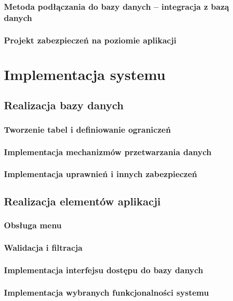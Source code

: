 \documentclass[a4paper, 12pt]{article}
\begin{document}
\subsubsection{Metoda podłączania do bazy danych – integracja z bazą danych}
\subsubsection{Projekt zabezpieczeń na poziomie aplikacji}

\section{Implementacja systemu}
\subsection{Realizacja bazy danych}
\subsubsection{Tworzenie tabel i definiowanie ograniczeń}
\subsubsection{Implementacja mechanizmów przetwarzania danych}
\subsubsection{Implementacja uprawnień i innych zabezpieczeń}

\subsection{Realizacja elementów aplikacji}
\subsubsection{Obsługa menu}
\subsubsection{Walidacja i filtracja}
\subsubsection{Implementacja interfejsu dostępu do bazy danych}
\subsubsection{Implementacja wybranych funkcjonalności systemu}
\end{document}
